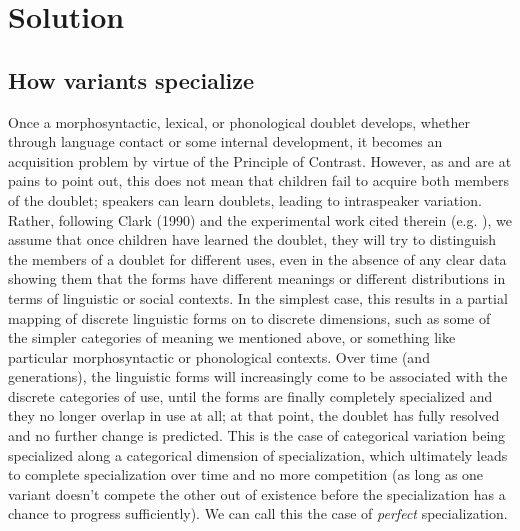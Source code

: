 
\section{Solution}
\label{solution}
 \subsection{How variants specialize}
 \label{options}
Once a morphosyntactic, lexical, or phonological doublet develops, whether through language contact or some internal development, it becomes an acquisition problem by virtue of the Principle of Contrast. 
However, as \citet{kroch1994} and \citet{yang2000,yang2002} are at pains to point out, this does not mean that children fail to acquire both members of the doublet; speakers can learn doublets, leading to intraspeaker variation.
Rather, following Clark (1990) and the experimental work cited therein (e.g. \citealt{markmanwachtel1988}), we assume that once children have learned the doublet, they will try to distinguish the members of a doublet for different uses, even in the absence of any clear data showing them that the forms have different meanings or different distributions in terms of linguistic or social contexts. 
In the simplest case, this results in a partial mapping of discrete linguistic forms on to discrete dimensions, such as some of the simpler categories of meaning we mentioned above, or something like particular morphosyntactic or phonological contexts. 
Over time (and generations), the linguistic forms will increasingly come to be associated with the discrete categories of use, until the forms are finally completely specialized and they no longer overlap in use at all; at that point, the doublet has fully resolved and no further change is predicted.
This is the case of categorical variation being specialized along a categorical dimension of specialization, which ultimately leads to complete specialization over time and no more competition (as long as one variant doesn't compete the other out of existence before the specialization has a chance to progress sufficiently).
We can call this the case of \textsl{perfect} specialization.

